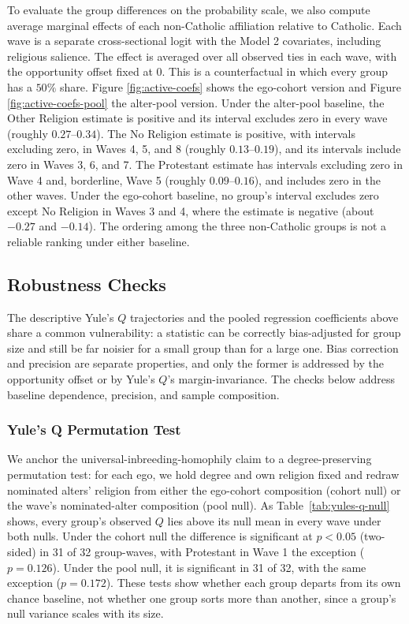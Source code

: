 \documentclass[11pt]{article}
\begin{document}
To evaluate the group differences on the probability scale, we also compute average marginal effects of each non-Catholic affiliation relative to Catholic. Each wave is a separate cross-sectional logit with the Model 2 covariates, including religious salience. The effect is averaged over all observed ties in each wave, with the opportunity offset fixed at $0$. This is a counterfactual in which every group has a $50\%$ share. Figure \ref{fig:active-coefs} shows the ego-cohort version and Figure \ref{fig:active-coefs-pool} the alter-pool version. Under the alter-pool baseline, the Other Religion estimate is positive and its interval excludes zero in every wave (roughly $0.27$--$0.34$). The No Religion estimate is positive, with intervals excluding zero, in Waves 4, 5, and 8 (roughly $0.13$--$0.19$), and its intervals include zero in Waves 3, 6, and 7. The Protestant estimate has intervals excluding zero in Wave 4 and, borderline, Wave 5 (roughly $0.09$--$0.16$), and includes zero in the other waves. Under the ego-cohort baseline, no group's interval excludes zero except No Religion in Waves 3 and 4, where the estimate is negative (about $-0.27$ and $-0.14$). The ordering among the three non-Catholic groups is not a reliable ranking under either baseline.

\subsection{Robustness Checks}
\label{sec:robustness}

The descriptive Yule's $Q$ trajectories and the pooled regression coefficients above share a common vulnerability: a statistic can be correctly bias-adjusted for group size and still be far noisier for a small group than for a large one. Bias correction and precision are separate properties, and only the former is addressed by the opportunity offset or by Yule's $Q$'s margin-invariance. The checks below address baseline dependence, precision, and sample composition.

\subsubsection{Yule's Q Permutation Test}

We anchor the universal-inbreeding-homophily claim to a degree-preserving permutation test: for each ego, we hold degree and own religion fixed and redraw nominated alters' religion from either the ego-cohort composition (cohort null) or the wave's nominated-alter composition (pool null). As Table~\ref{tab:yules-q-null} shows, every group's observed $Q$ lies above its null mean in every wave under both nulls. Under the cohort null the difference is significant at $p < 0.05$ (two-sided) in 31 of 32 group-waves, with Protestant in Wave 1 the exception ($p = 0.126$). Under the pool null, it is significant in 31 of 32, with the same exception ($p = 0.172$). These tests show whether each group departs from its own chance baseline, not whether one group sorts more than another, since a group's null variance scales with its size.
\end{document}
